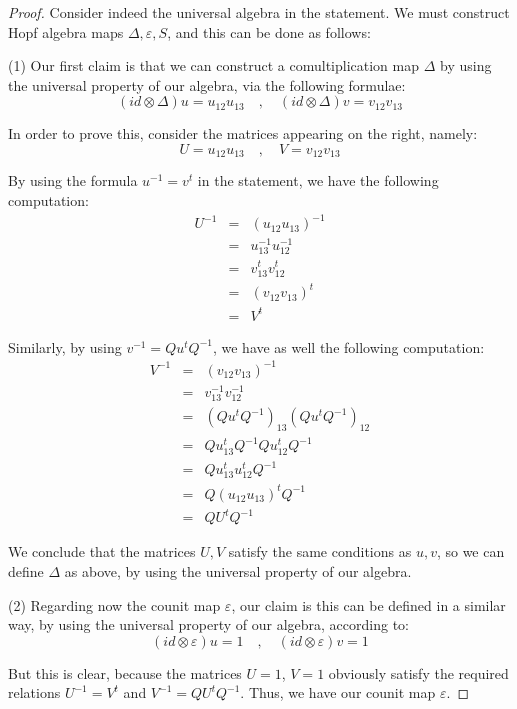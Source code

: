 \documentclass[12pt]{amsbook}
\begin{document}
\begin{proof}
Consider indeed the universal algebra in the statement. We must construct Hopf algebra maps $\Delta,\varepsilon,S$, and this can be done as follows:

\medskip

(1) Our first claim is that we can construct a comultiplication map $\Delta$ by using the universal property of our algebra, via the following formulae:
$$(id\otimes\Delta)u=u_{12}u_{13}\quad,\quad (id\otimes\Delta)v=v_{12}v_{13}$$

In order to prove this, consider the matrices appearing on the right, namely:
$$U=u_{12}u_{13}\quad,\quad V=v_{12}v_{13}$$

By using the formula $u^{-1}=v^t$ in the statement, we have the following computation:
\begin{eqnarray*}
U^{-1}
&=&(u_{12}u_{13})^{-1}\\
&=&u_{13}^{-1}u_{12}^{-1}\\
&=&v_{13}^tv_{12}^t\\
&=&(v_{12}v_{13})^t\\
&=&V^t
\end{eqnarray*}

Similarly, by using $v^{-1}=Qu^tQ^{-1}$, we have as well the following computation:
\begin{eqnarray*}
V^{-1}
&=&(v_{12}v_{13})^{-1}\\
&=&v_{13}^{-1}v_{12}^{-1}\\
&=&(Qu^tQ^{-1})_{13}(Qu^tQ^{-1})_{12}\\
&=&Qu_{13}^tQ^{-1}Qu_{12}^tQ^{-1}\\
&=&Qu_{13}^tu_{12}^tQ^{-1}\\
&=&Q(u_{12}u_{13})^tQ^{-1}\\
&=&QU^tQ^{-1}
\end{eqnarray*}

We conclude that the matrices $U,V$ satisfy the same conditions as $u,v$, so we can define $\Delta$ as above, by using the universal property of our algebra.

\medskip

(2) Regarding now the counit map $\varepsilon$, our claim is this can be defined in a similar way, by using the universal property of our algebra, according to:
$$(id\otimes\varepsilon)u=1\quad,\quad (id\otimes\varepsilon)v=1$$

But this is clear, because the matrices $U=1$, $V=1$ obviously satisfy the required relations $U^{-1}=V^t$ and $V^{-1}=QU^tQ^{-1}$. Thus, we have our counit map $\varepsilon$.


\end{proof}
\end{document}
